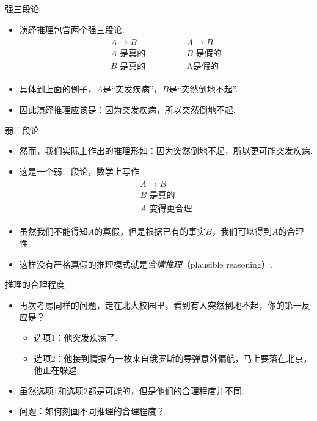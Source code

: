{强三段论}
\begin{itemize}
    \item 演绎推理包含两个强三段论.
    \[
        \begin{array}{c}
            \begin{array}{c}  
                A \to B \\ A\text{ 是真的} \\ \hline B\text{ 是真的}
            \end{array} 
            \qquad \qquad 
            \begin{array}{c}  
                A \to B \\ B\text{ 是假的} \\ \hline \text{A是假的}
            \end{array}
        \end{array} 
    \]
    \item 具体到上面的例子，$A$是``突发疾病''，$B$是``突然倒地不起''.
    \item 因此演绎推理应该是：因为突发疾病，所以突然倒地不起.
\end{itemize}


{弱三段论}
\begin{itemize}
    \item 然而，我们实际上作出的推理形如：因为突然倒地不起，所以更可能突发疾病.
    \item 这是一个弱三段论，数学上写作 
        \[
        \begin{array}{c}
            \begin{array}{c}  
                A \to B \\ B\text{ 是真的} \\ \hline A\text{ 变得更合理}
            \end{array} 
        \end{array} 
    \]
    \item 虽然我们不能得知$A$的真假，但是根据已有的事实$B$，我们可以得到$A$的合理性.
    \item 这样没有严格真假的推理模式就是\emph{合情推理}（plausible reasoning）.
\end{itemize}


{推理的合理程度}
\begin{itemize}
    \item 再次考虑同样的问题，走在北大校园里，看到有人突然倒地不起，你的第一反应是？
    \begin{itemize}
        \item 选项1：他突发疾病了.
        \item 选项2：他接到情报有一枚来自俄罗斯的导弹意外偏航，马上要落在北京，他正在躲避.
    \end{itemize}
    \item 虽然选项1和选项2都是可能的，但是他们的合理程度并不同.
    \item 问题：如何刻画不同推理的合理程度？
\end{itemize}


